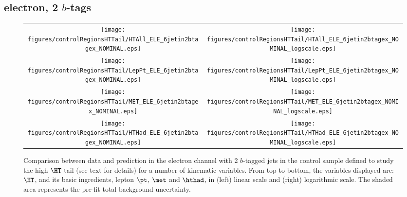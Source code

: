 \clearpage
\subsection{electron, 2 $b$-tags}
\label{sec:ELE_controlHTTail_2tagex}

\begin{figure}[htbp]
\begin{center}
\begin{tabular}{cc}
%
\texttt{[image: figures/controlRegionsHTTail/HTAll\_ELE\_6jetin2btagex\_NOMINAL.eps]} &
\texttt{[image: figures/controlRegionsHTTail/HTAll\_ELE\_6jetin2btagex\_NOMINAL\_logscale.eps]} \\
\texttt{[image: figures/controlRegionsHTTail/LepPt\_ELE\_6jetin2btagex\_NOMINAL.eps]} &
\texttt{[image: figures/controlRegionsHTTail/LepPt\_ELE\_6jetin2btagex\_NOMINAL\_logscale.eps]} \\
\texttt{[image: figures/controlRegionsHTTail/MET\_ELE\_6jetin2btagex\_NOMINAL.eps]} &
\texttt{[image: figures/controlRegionsHTTail/MET\_ELE\_6jetin2btagex\_NOMINAL\_logscale.eps]} \\
\texttt{[image: figures/controlRegionsHTTail/HTHad\_ELE\_6jetin2btagex\_NOMINAL.eps]} &
\texttt{[image: figures/controlRegionsHTTail/HTHad\_ELE\_6jetin2btagex\_NOMINAL\_logscale.eps]} \\

\end{tabular}\caption{\small {Comparison between data and prediction in the electron channel with 2 $b$-tagged jets in the control sample
defined to study the high $\HT$ tail (see text for details)  for a number of kinematic
variables. From top to bottom, the variables displayed are: $\HT$, and its basic ingredients, lepton $\pt$, $\met$ and $\hthad$,
in (left) linear scale and (right) logarithmic scale.
The shaded area represents the pre-fit total background uncertainty.}}
\label{fig:ELE_controlHTTail_2btagex_1}
\end{center}
\end{figure}
